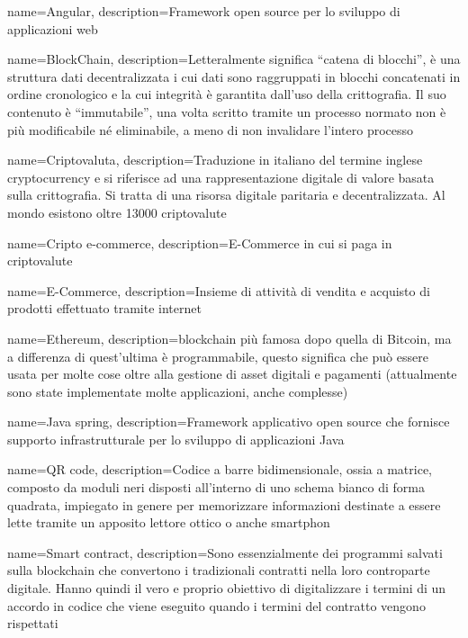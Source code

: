 {
	name={Angular},
	description={Framework open source per lo sviluppo di applicazioni web}
}

{
	name={BlockChain},
	description={Letteralmente significa “catena di blocchi”, è una struttura dati decentralizzata i cui dati sono raggruppati in blocchi concatenati in ordine cronologico e la cui integrità è garantita dall’uso della crittografia. Il suo contenuto è “immutabile”, una volta scritto tramite un processo normato non è più modificabile né eliminabile, a meno di non invalidare l’intero processo}
}

{
	name={Criptovaluta},
	description={Traduzione in italiano del termine inglese cryptocurrency e si riferisce ad una rappresentazione digitale di valore basata sulla crittografia. Si tratta di una risorsa digitale paritaria e decentralizzata. Al mondo esistono oltre 13000 criptovalute}
}

{
	name={Cripto e-commerce},
	description={E-Commerce in cui si paga in criptovalute}
}

{
	name={E-Commerce},
	description={Insieme di attività di vendita e acquisto di prodotti effettuato tramite internet}
}

{
	name={Ethereum},
	description={blockchain più famosa dopo quella di Bitcoin\glo, ma a differenza di quest’ultima è programmabile, questo significa che può essere usata per molte cose oltre alla gestione di asset digitali e pagamenti (attualmente sono state implementate molte applicazioni, anche complesse)}
}

{
	name={Java spring},
	description={Framework applicativo open source che fornisce supporto infrastrutturale per lo sviluppo di applicazioni Java}
}

{
	name={QR code},
	description={Codice a barre bidimensionale, ossia a matrice, composto da moduli neri disposti all'interno di uno schema bianco di forma quadrata, impiegato in genere per memorizzare informazioni destinate a essere lette tramite un apposito lettore ottico o anche smartphon}
}

{
	name={Smart contract},
	description={Sono essenzialmente dei programmi salvati sulla blockchain che convertono i tradizionali contratti nella loro controparte digitale. Hanno quindi il vero e proprio obiettivo di digitalizzare i termini di un accordo in codice che viene eseguito quando i termini del contratto vengono rispettati}
}

